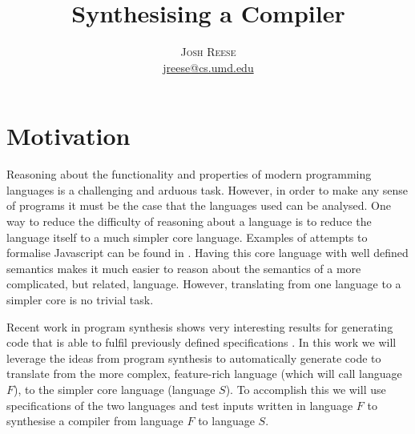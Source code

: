 \documentclass[twoside]{article}
\title{\vspace{-15mm}\fontsize{24pt}{10pt}\selectfont\textbf{
    Synthesising a Compiler} } %
\author{
  \large
  \textsc{Josh Reese}\\[2mm] %
  \normalsize \href{mailto:jreese@cs.umd.edu}{jreese@cs.umd.edu}
  \vspace{-5mm}
}
\date{}
\begin{document}
\maketitle %
\thispagestyle{fancy} %



\section{Motivation}
Reasoning about the functionality and properties of modern programming
languages is a challenging and arduous task. However, in order to make any
sense of programs it must be the case that the languages used
can be analysed. One way to reduce the difficulty of reasoning about a
language is to reduce the language itself to a much simpler core
language. Examples of attempts to formalise Javascript can be found in
\cite{ljs,js}. Having this core language with
well defined semantics makes it much easier to reason about the
semantics of a more complicated, but related, language. However,
translating from one language to a simpler core is no trivial task.

Recent work in program synthesis shows very interesting results for
generating code that is able to fulfil previously defined
specifications \cite{flash,invert,sygus,feedback,sketch}. In this work
we will leverage the ideas from program synthesis to automatically
generate code to translate from the more complex, feature-rich
language (which will call language $F$), to the simpler core
language (language $S$). To accomplish this we will use specifications
of the two languages and test inputs written in language $F$ to
synthesise a compiler from language $F$ to language $S$.
\end{document}
